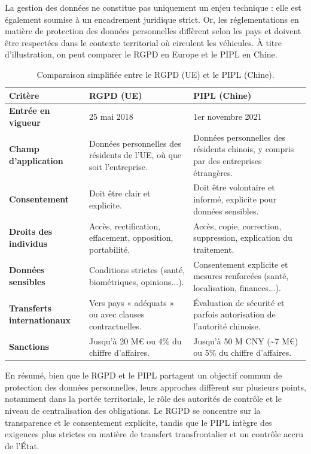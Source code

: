 La gestion des données ne constitue pas uniquement un enjeu technique : elle est également soumise à un encadrement juridique strict. Or, les réglementations en matière de protection des données personnelles diffèrent selon les pays et doivent être respectées dans le contexte territorial où circulent les véhicules. À titre d’illustration, on peut comparer le RGPD en Europe et le PIPL en Chine. 

\begin{table}[H]
\centering
\begin{tabular}{|p{4cm}|p{5cm}|p{5cm}|}
\hline
\textbf{Critère} & \textbf{RGPD (UE)} & \textbf{PIPL (Chine)} \\ \hline
\textbf{Entrée en vigueur} & 25 mai 2018 & 1er novembre 2021 \\ \hline
\textbf{Champ d’application} & Données personnelles des résidents de l’UE, où que soit l’entreprise. & Données personnelles des résidents chinois, y compris par des entreprises étrangères. \\ \hline
\textbf{Consentement} & Doit être clair et explicite. & Doit être volontaire et informé, explicite pour données sensibles. \\ \hline
\textbf{Droits des individus} & Accès, rectification, effacement, opposition, portabilité. & Accès, copie, correction, suppression, explication du traitement. \\ \hline
\textbf{Données sensibles} & Conditions strictes (santé, biométriques, opinions...). & Consentement explicite et mesures renforcées (santé, localisation, finances...). \\ \hline
\textbf{Transferts internationaux} & Vers pays « adéquats » ou avec clauses contractuelles. & Évaluation de sécurité et parfois autorisation de l’autorité chinoise. \\ \hline
\textbf{Sanctions} & Jusqu’à 20 M€ ou 4\% du chiffre d'affaires. & Jusqu’à 50 M CNY (\textasciitilde 7 M€) ou 5\% du chiffre d'affaires. \\ \hline
\end{tabular}
\caption{Comparaison simplifiée entre le RGPD (UE) et le PIPL (Chine).}
\end{table}
En résumé, bien que le RGPD et le PIPL partagent un objectif commun de protection des données personnelles, leurs approches diffèrent sur plusieurs points, notamment dans la portée territoriale, le rôle des autorités de contrôle et le niveau de centralisation des obligations. Le RGPD se concentre sur la transparence et le consentement explicite, 
tandis que le PIPL intègre des exigences plus strictes en matière de transfert transfrontalier et un contrôle accru de l’État.\\
